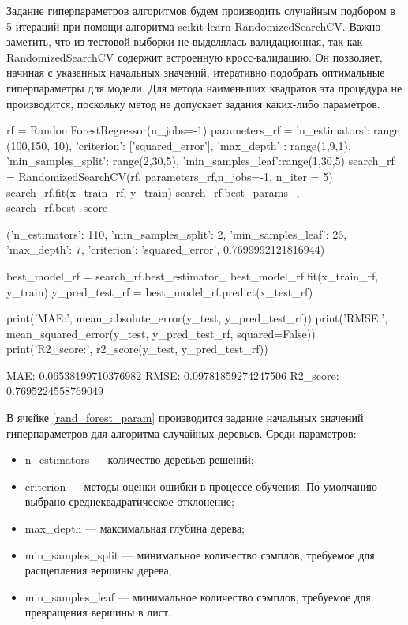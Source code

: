 Задание гиперпараметров алгоритмов \cite{feurer2019hyperparameter} будем производить случайным подбором в 5 итераций при помощи алгоритма scikit-learn RandomizedSearchCV. Важно заметить, что из тестовой выборки не выделялась валидационная, так как RandomizedSearchCV содержит встроенную кросс-валидацию. Он позволяет, начиная с указанных начальных значений, итеративно подобрать оптимальные гиперпараметры для модели. Для метода наименьших квадратов эта процедура не производится, поскольку метод не допускает задания каких-либо параметров.
\begin{pyin}
rf = RandomForestRegressor(n_jobs=-1)
parameters_rf = {'n_estimators': range (100,150, 10),
    'criterion':  ['squared_error'],
    'max_depth' : range(1,9,1),
    'min_samples_split': range(2,30,5),
    'min_samples_leaf':range(1,30,5)
}
search_rf = RandomizedSearchCV(rf, parameters_rf,n_jobs=-1, n_iter = 5)
search_rf.fit(x_train_rf, y_train)
search_rf.best_params_, search_rf.best_score_
\end{pyin}
\begin{pyprint}
({'n_estimators': 110,
    'min_samples_split': 2,
    'min_samples_leaf': 26,
    'max_depth': 7,
    'criterion': 'squared_error'},
0.7699992121816944)
\end{pyprint}
\begin{pyin}
best_model_rf = search_rf.best_estimator_
best_model_rf.fit(x_train_rf, y_train)
y_pred_test_rf = best_model_rf.predict(x_test_rf)

print('MAE:', mean_absolute_error(y_test, y_pred_test_rf))
print('RMSE:', mean_squared_error(y_test, y_pred_test_rf, squared=False))
print('R2_score:', r2_score(y_test, y_pred_test_rf))
\end{pyin}
\begin{pyprint}
MAE: 0.06538199710376982
RMSE: 0.09781859274247506
R2_score: 0.7695224558769049
\end{pyprint}
В ячейке \ref{rand_forest_param} производится задание начальных значений гиперпараметров для алгоритма случайных деревьев. Среди параметров:
\begin{itemize}
	\item n\_estimators --- количество деревьев решений;
	\item criterion --- методы оценки ошибки в процессе обучения. По умолчанию выбрано среднеквадратическое отклонение;
	\item max\_depth --- максимальная глубина дерева;
	\item min\_samples\_split --- минимальное количество сэмплов, требуемое для расщепления вершины дерева;
	\item min\_samples\_leaf --- минимальное количество сэмплов, требуемое для превращения вершины в лист.
\end{itemize}
